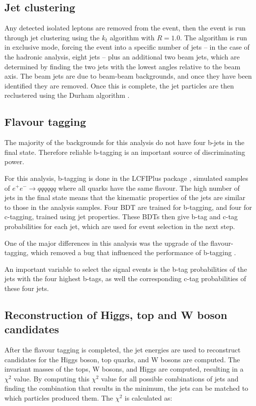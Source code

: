 \subsection{Jet clustering}
Any detected isolated leptons are removed from the event, then the event is run through jet clustering using the $k_t$ algorithm \cite{kt-jet-clustering} with $R = 1.0$. The algorithm is run in exclusive mode, forcing the event into a specific number of jets -- in  the case of the hadronic analysis, eight jets -- plus an additional two beam jets, which are determined by finding the two jets with the lowest angles relative to the beam axis. The beam jets are due to beam-beam backgrounds, and once they have been identified they are removed. Once this is complete, the jet particles are then reclustered using the Durham algorithm \cite{durham-jet-clustering}.

\subsection{Flavour tagging}
\label{section:flavour-tagging}
The majority of the backgrounds for this analysis do not have four b-jets in the final state. Therefore reliable b-tagging is an important source of discriminating power.

For this analysis, b-tagging is done in the LCFIPlus package \cite{lcfiplus}, simulated samples of $e^+ e^- \rightarrow qqqqqq$ where all quarks have the same flavour. The high number of jets in the final state means that the kinematic properties of the jets are similar to those in the analysis samples. Four \acrfull{BDT} are trained for b-tagging, and four for c-tagging, trained using jet properties. These \acrshort{BDT}s then give b-tag and c-tag probabilities for each jet, which are used for event selection in the next step.

One of the major differences in this analysis was the upgrade of the flavour-tagging, which removed a bug that influenced the performance of b-tagging \cite{clic-yukawa-coupling-2014}.

An important variable to select the signal events is the b-tag probabilities of the jets with the four highest b-tags, as well the corresponding c-tag probabilities of these four jets.

\subsection{Reconstruction of Higgs, top and W boson candidates}
\label{section:chi-squared}
After the flavour tagging is completed, the jet energies are used to reconstruct candidates for the Higgs boson, top quarks, and W bosons are computed. The invariant masses of the tops, W bosons, and Higgs are computed, resulting in a $\chi^2$ value. By computing this $\chi^2$ value for all possible combinations of jets and finding the combination that results in the minimum, the jets can be matched to which particles produced them. The $\chi^2$ is calculated as:

